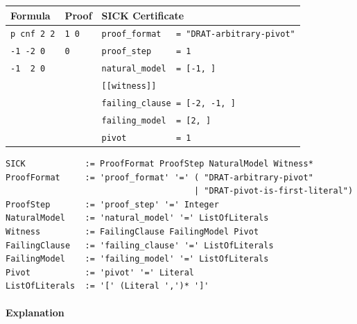 \documentclass[
]{report}
\begin{document}
\begin{longtable}[]{@{}lll@{}}
\toprule
Formula & Proof & SICK Certificate\tabularnewline
\midrule
\endhead
\texttt{p\ cnf\ 2\ 2} & \texttt{1\ 0} &
\texttt{proof\_format\ \ \ =\ "DRAT-arbitrary-pivot"}\tabularnewline
\texttt{-1\ -2\ 0} & \texttt{0} &
\texttt{proof\_step\ \ \ \ \ =\ 1}\tabularnewline
\texttt{-1\ \ 2\ 0} & &
\texttt{natural\_model\ \ =\ {[}-1,\ {]}}\tabularnewline
& & \texttt{{[}{[}witness{]}{]}}\tabularnewline
& & \texttt{failing\_clause\ =\ {[}-2,\ -1,\ {]}}\tabularnewline
& & \texttt{failing\_model\ \ =\ {[}2,\ {]}}\tabularnewline
& & \texttt{pivot\ \ \ \ \ \ \ \ \ \ =\ 1}\tabularnewline
\bottomrule
\end{longtable}

\begin{verbatim}
SICK            := ProofFormat ProofStep NaturalModel Witness*
ProofFormat     := 'proof_format' '=' ( "DRAT-arbitrary-pivot"
                                      | "DRAT-pivot-is-first-literal")
ProofStep       := 'proof_step' '=' Integer
NaturalModel    := 'natural_model' '=' ListOfLiterals
Witness         := FailingClause FailingModel Pivot
FailingClause   := 'failing_clause' '=' ListOfLiterals
FailingModel    := 'failing_model' '=' ListOfLiterals
Pivot           := 'pivot' '=' Literal
ListOfLiterals  := '[' (Literal ',')* ']'
\end{verbatim}

\fi

\paragraph{Explanation}
\end{document}
